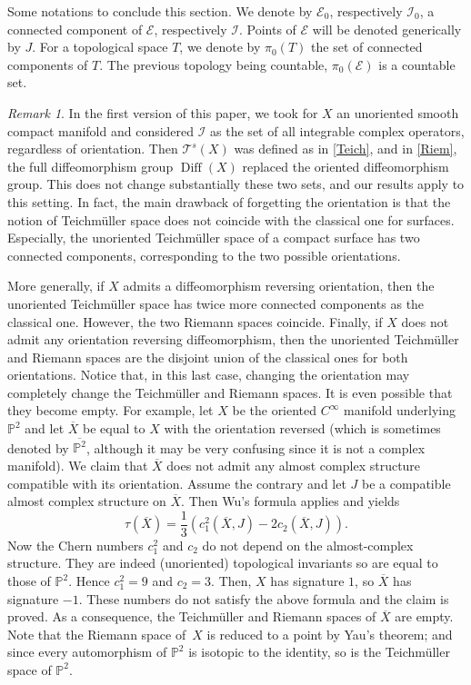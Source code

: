 \documentclass[JEP,XML,SOM,Unicode]{cedram}
\let\mathcal\mathscr
\DeclareMathOperator{\Diff}{Diff}
\theoremstyle{plain}
\theoremstyle{definition}
\theoremstyle{remark}
\newtheorem{remark}[theorem]{Remark}
\numberwithin{equation}{section}
\newcommand{\cI}{\mathcal{I}}
\begin{document}
Some notations to conclude this section. We denote by $\mathcal E_0$, respectively $\cI_0$, a connected component of $\mathcal E$, respectively $\cI$. Points of $\mathcal E$ will be denoted generically by $J$. For a topological space $T$, we denote by $\pi_0(T)$ the set of connected components of $T$. The previous topology being countable, $\pi_0(\mathcal E)$ is a countable set.
\begin{remark}
\label{oriented}
In the first version of this paper, we took for $X$ an unoriented smooth compact manifold and considered $\cI$ as the set of all integrable complex operators, regardless of orientation. Then $\mathcal T^s(X)$ was defined as in \eqref{Teich}, and in \eqref{Riem}, the full diffeomorphism group $\Diff(X)$ replaced the oriented diffeomorphism group. This does not change substantially these two sets, and our results apply to this setting. In fact, the main drawback of forgetting the orientation is that the notion of Teichmüller space does not coincide with the classical one for surfaces. Especially, the unoriented Teichmüller space of a compact surface has two connected components, corresponding to the two possible orientations.

More generally, if $X$ admits a diffeomorphism reversing orientation, then the unoriented Teichmüller space has twice more connected components as the classical one. However, the two Riemann spaces coincide. Finally, if $X$ does not admit any orientation reversing diffeomorphism, then the unoriented Teichmüller and Riemann spaces are the disjoint union of the classical ones for both orientations. Notice that, in this last case, changing the orientation may completely change the Teichmüller and \hbox{Riemann} spaces. It is even possible that they become empty. For example, let $X$ be the oriented $C^\infty$ manifold underlying $\mathbb P^2$ and let $\overline{X}$ be equal to $X$ with the orientation reversed (which is sometimes denoted by $\overline{\mathbb P^2}$, although it may be very confusing since it is not a complex manifold). We claim that $\overline{X}$ does not admit any almost complex structure compatible with its orientation. Assume the contrary and let $J$ be a compatible almost complex structure on $\overline{X}$. Then Wu's formula applies and yields
\begin{equation*}
\tau(\overline{X})=\dfrac{1}{3}(c_1^2(\overline{X},J)-2c_2(\overline{X},J)).
\end{equation*}
Now the Chern numbers $c_1^2$ and $c_2$ do not depend on the almost-complex structure. They are indeed (unoriented) topological invariants so are equal to those of $\mathbb P^2$. Hence $c_1^2=9$ and $c_2=3$. Then, $X$ has signature $1$, so $\overline{X}$ has signature $-1$. These numbers do not satisfy the above formula and the claim is proved. As a consequence, the Teichmüller and Riemann spaces of $\overline{X}$ are empty. Note that the Riemann space of~$X$ is reduced to a point by Yau's theorem; and since every automorphism of $\mathbb P^2$ is isotopic to the identity, so is the Teichmüller space of $\mathbb P^2$.
\end{remark}
\end{document}
